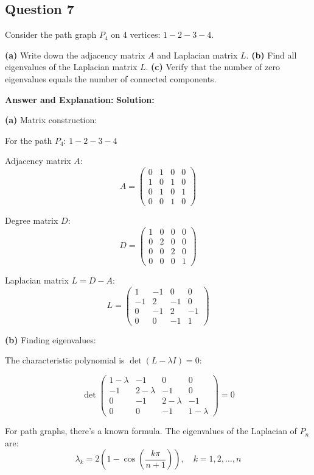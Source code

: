 \documentclass[11pt]{article}
\newenvironment{answer}{\color{answercolor}\begin{framed}\textbf{Answer and Explanation:}}{\end{framed}}
\begin{document}
\subsection{Question 7}
Consider the path graph $P_4$ on 4 vertices: $1-2-3-4$.

\textbf{(a)} Write down the adjacency matrix $A$ and Laplacian matrix $L$.
\textbf{(b)} Find all eigenvalues of the Laplacian matrix $L$.
\textbf{(c)} Verify that the number of zero eigenvalues equals the number of connected components.

\begin{answer}
\textbf{Solution:}

\textbf{(a)} Matrix construction:

For the path $P_4$: $1-2-3-4$

Adjacency matrix $A$:
$$A = \begin{pmatrix}
0 & 1 & 0 & 0 \\
1 & 0 & 1 & 0 \\
0 & 1 & 0 & 1 \\
0 & 0 & 1 & 0
\end{pmatrix}$$

Degree matrix $D$:
$$D = \begin{pmatrix}
1 & 0 & 0 & 0 \\
0 & 2 & 0 & 0 \\
0 & 0 & 2 & 0 \\
0 & 0 & 0 & 1
\end{pmatrix}$$

Laplacian matrix $L = D - A$:
$$L = \begin{pmatrix}
1 & -1 & 0 & 0 \\
-1 & 2 & -1 & 0 \\
0 & -1 & 2 & -1 \\
0 & 0 & -1 & 1
\end{pmatrix}$$

\textbf{(b)} Finding eigenvalues:

The characteristic polynomial is $\det(L - \lambda I) = 0$:

$$\det\begin{pmatrix}
1-\lambda & -1 & 0 & 0 \\
-1 & 2-\lambda & -1 & 0 \\
0 & -1 & 2-\lambda & -1 \\
0 & 0 & -1 & 1-\lambda
\end{pmatrix} = 0$$

For path graphs, there's a known formula. The eigenvalues of the Laplacian of $P_n$ are:
$$\lambda_k = 2\left(1 - \cos\left(\frac{k\pi}{n+1}\right)\right), \quad k = 1, 2, \ldots, n$$


\end{answer}
\end{document}

